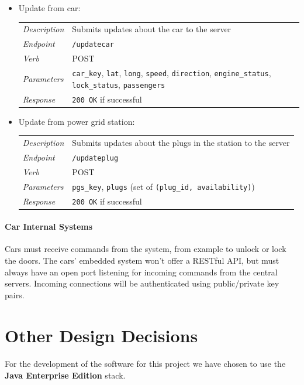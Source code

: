 \documentclass[english]{article}
\newcommand{\code}[1]{\texttt{#1}}
\begin{document}
\begin{itemize}
	\item{Update from car:}\\
	\begin{tabular}{ | l l }
		\textit{Description} & Submits updates about the car to the server\\
		\textit{Endpoint} & \code{/updatecar} \\ 
		\textit{Verb} & POST \\  
		\textit{Parameters} & \code{car\_key}, \code{lat}, \code{long}, \code{speed}, \code{direction}, \code{engine\_status}, \code{lock\_status}, \code{passengers}\\
		\textit{Response} & \code{200 OK} if successful
	\end{tabular}
	
	\item{Update from power grid station:}\\
	\begin{tabular}{ | l l }
		\textit{Description} & Submits updates about the plugs in the station to the server\\
		\textit{Endpoint} & \code{/updateplug} \\ 
		\textit{Verb} & POST \\  
		\textit{Parameters} & \code{pgs\_key}, \code{plugs} (set of \code{(plug\_id, availability)})\\
		\textit{Response} & \code{200 OK} if successful
	\end{tabular}

\end{itemize}

\paragraph{Car Internal Systems}
Cars must receive commands from the system, from example to unlock or lock the doors. 
The cars' embedded system won't offer a RESTful API, but must always have an open port listening for incoming commands from the central servers. Incoming connections will be authenticated using public/private key pairs.


\newpage
\section{Other Design Decisions}

\paragraph{}
For the development of the software for this project we have chosen to use the \textbf{Java Enterprise Edition} stack.
\end{document}
